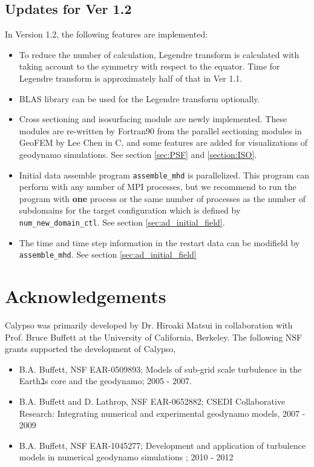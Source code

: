 \subsection{Updates for Ver 1.2}
In Version 1.2, the following features are implemented:
\begin{itemize}
\item To reduce the number of calculation, Legendre transform is calculated with taking account to the symmetry with respect to the equator. Time for Legendre transform is approximately half of that in Ver 1.1.
\item BLAS library can be used for the Legendre transform optionally.
\item Cross sectioning and isosurfacing module are newly implemented. These modules are re-written by Fortran90 from the parallel sectioning modules in GeoFEM by Lee Chen in C, and some features are added for visualizations of geodynamo simulations. See section \ref{sec:PSF} and \ref{section:ISO}.
\item Initial data assemble program \verb|assemble_mhd| is parallelized. This program can perform with any number of MPI processes, but we recommend to run the program with {\bf one} process or the same number of processes as the number of subdomains for the target configuration which is defined by \verb|num_new_domain_ctl|. See section \ref{sec:ad_initial_field}.
\item The time and time step information in the restart data can be modifield by  \verb|assemble_mhd|. See section \ref{sec:ad_initial_field}
\end{itemize}


\section{Acknowledgements}
\label{section:acknowledgements}
Calypso was primarily developed by Dr. Hiroaki Matsui in collaboration with Prof. Bruce Buffett at the University of California, Berkeley. The following NSF grants supported the development of Calypso, 
%
\begin{itemize}
\item B.A. Buffett, NSF EAR-0509893; Models of sub-grid scale turbulence in the Earthﾕs core and the geodynamo; 2005 - 2007.
\item B.A. Buffett and D. Lathrop,  NSF EAR-0652882; CSEDI Collaborative Research: Integrating numerical and experimental geodynamo models, 2007 - 2009
\item B.A. Buffett, NSF EAR-1045277; Development and application of turbulence models in numerical geodynamo simulations ;  2010 - 2012
\end{itemize}
%

